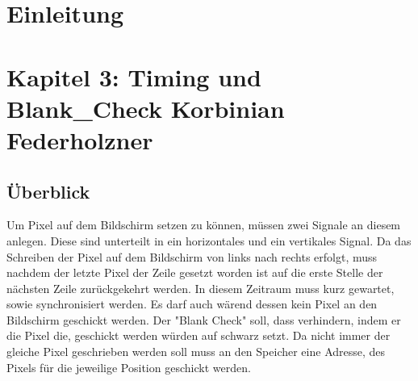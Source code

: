 \documentclass[12pt,a4paper,bibliography=totoc,listof=totoc]{scrartcl}
\begin{document}
\renewcommand{\sectionmark}[1]{\markright{#1}}
\renewcommand{\subsectionmark}[1]{}
\renewcommand{\subsubsectionmark}[1]{}
\rhead{\rightmark}

{}
\renewcommand{\thesection}{\arabic{section}}
\renewcommand{\theHsection}{\arabic{section}}
\setcounter{section}{0}
\setcounter{page}{1}

\section{Einleitung}


\pagebreak
\section{Kapitel 3: Timing und Blank\_Check Korbinian Federholzner}
\subsection{Überblick}
Um Pixel auf dem Bildschirm setzen zu können, müssen zwei Signale an diesem anlegen. Diese sind unterteilt in ein horizontales und ein vertikales Signal. 
Da das Schreiben der Pixel auf dem Bildschirm von links nach rechts erfolgt, muss nachdem der letzte Pixel der Zeile gesetzt worden ist auf die erste Stelle 
der nächsten Zeile zurückgekehrt werden. In diesem Zeitraum muss kurz gewartet, sowie synchronisiert werden. Es darf auch wärend dessen kein Pixel an den Bildschirm
geschickt werden. Der "Blank Check" soll, dass verhindern, indem er die Pixel die, geschickt werden würden auf schwarz setzt. Da nicht immer der gleiche Pixel 
geschrieben werden soll muss an den Speicher eine Adresse, des Pixels für die jeweilige Position geschickt werden. 
\end{document}
